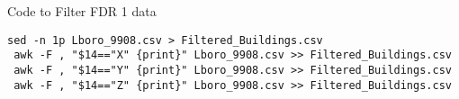 \begin{algorithm}
	\caption{Code to Filter FDR 1 data}
	\label{alg:Filtering_Code}
\begin{lstlisting}
sed -n 1p Lboro_9908.csv > Filtered_Buildings.csv
 awk -F , "$14=="X" {print}" Lboro_9908.csv >> Filtered_Buildings.csv
 awk -F , "$14=="Y" {print}" Lboro_9908.csv >> Filtered_Buildings.csv
 awk -F , "$14=="Z" {print}" Lboro_9908.csv >> Filtered_Buildings.csv
 \end{lstlisting}
\end{algorithm}
